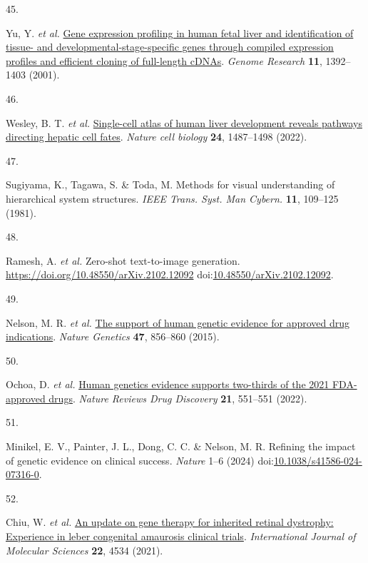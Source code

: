 \documentclass[
]{article}
\newlength{\cslhangindent}
\newlength{\csllabelwidth}
\newenvironment{CSLReferences}[2] %
 {\begin{list}{}{%
  \setlength{\itemindent}{0pt}
  \setlength{\leftmargin}{0pt}
  \setlength{\parsep}{0pt}
  \ifodd #1
   \setlength{\leftmargin}{\cslhangindent}
   \setlength{\itemindent}{-1\cslhangindent}
  \fi
  \setlength{\itemsep}{#2\baselineskip}}}
 {\end{list}}
\newcommand{\CSLLeftMargin}[1]{\parbox[t]{\csllabelwidth}{\strut#1\strut}}
\newcommand{\CSLRightInline}[1]{\parbox[t]{\linewidth - \csllabelwidth}{\strut#1\strut}}
\begin{document}
\begin{CSLReferences}{0}{0}
\CSLLeftMargin{45. }%
\CSLRightInline{Yu, Y. \emph{et al.}
\href{https://doi.org/10.1101/gr.175501}{Gene expression profiling in
human fetal liver and identification of tissue- and
developmental-stage-specific genes through compiled expression profiles
and efficient cloning of full-length cDNAs}. \emph{Genome Research}
\textbf{11}, 1392--1403 (2001).}

\CSLLeftMargin{46. }%
\CSLRightInline{Wesley, B. T. \emph{et al.}
\href{https://doi.org/10.1038/s41556-022-00989-7}{Single-cell atlas of
human liver development reveals pathways directing hepatic cell fates}.
\emph{Nature cell biology} \textbf{24}, 1487--1498 (2022).}

\CSLLeftMargin{47. }%
\CSLRightInline{Sugiyama, K., Tagawa, S. \& Toda, M. Methods for visual
understanding of hierarchical system structures. \emph{IEEE Trans. Syst.
Man Cybern.} \textbf{11}, 109--125 (1981).}

\CSLLeftMargin{48. }%
\CSLRightInline{Ramesh, A. \emph{et al.} Zero-shot text-to-image
generation. \url{https://doi.org/10.48550/arXiv.2102.12092}
doi:\href{https://doi.org/10.48550/arXiv.2102.12092}{10.48550/arXiv.2102.12092}.}

\CSLLeftMargin{49. }%
\CSLRightInline{Nelson, M. R. \emph{et al.}
\href{https://doi.org/10.1038/ng.3314}{The support of human genetic
evidence for approved drug indications}. \emph{Nature Genetics}
\textbf{47}, 856--860 (2015).}

\CSLLeftMargin{50. }%
\CSLRightInline{Ochoa, D. \emph{et al.}
\href{https://doi.org/10.1038/d41573-022-00120-3}{Human genetics
evidence supports two-thirds of the 2021 FDA-approved drugs}.
\emph{Nature Reviews Drug Discovery} \textbf{21}, 551--551 (2022).}

\CSLLeftMargin{51. }%
\CSLRightInline{Minikel, E. V., Painter, J. L., Dong, C. C. \& Nelson,
M. R. Refining the impact of genetic evidence on clinical success.
\emph{Nature} 1--6 (2024)
doi:\href{https://doi.org/10.1038/s41586-024-07316-0}{10.1038/s41586-024-07316-0}.}

\CSLLeftMargin{52. }%
\CSLRightInline{Chiu, W. \emph{et al.}
\href{https://doi.org/10.3390/ijms22094534}{An update on gene therapy
for inherited retinal dystrophy: Experience in leber congenital
amaurosis clinical trials}. \emph{International Journal of Molecular
Sciences} \textbf{22}, 4534 (2021).}


\end{CSLReferences}
\end{document}
